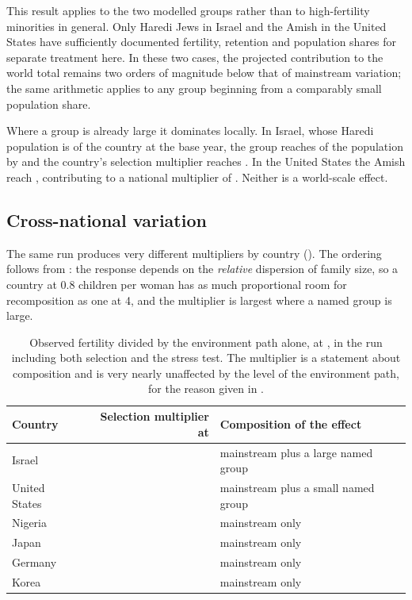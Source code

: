 This result applies to the two modelled groups rather than to high-fertility
minorities in general. Only Haredi Jews in Israel and the Amish in the United
States have sufficiently documented fertility, retention and population shares
for separate treatment here. In these two cases, the projected contribution to
the world total remains two orders of magnitude below that of mainstream
variation; the same arithmetic applies to any group beginning from a comparably
small population share.

Where a group is already large it dominates locally. In Israel, whose Haredi
population is \HarediShare{} of the country at the base year, the group reaches
\IsraelGroupShare{} of the population by \ProjectionEndYear{} and the country's
selection multiplier reaches \SelectionEffectIsrael{}. In the United States the
Amish reach \UnitedStatesGroupShare{}, contributing to a national multiplier of
\SelectionEffectUnitedStates{}. Neither is a world-scale effect.

\subsection{Cross-national variation}

The same run produces very different multipliers by country
(). The ordering follows from : the
response depends on the \emph{relative} dispersion of family size, so a country
at 0.8 children per woman has as much proportional room for recomposition as one
at 4, and the multiplier is largest where a named group is large.

\begin{table}[t]
\centering
\small
\begin{tabular}{lrl}
\toprule
Country & Selection multiplier at \ProjectionEndYear{} & Composition of the effect \\
\midrule
Israel          & \SelectionEffectIsrael{}        & mainstream plus a large named group \\
United States   & \SelectionEffectUnitedStates{}  & mainstream plus a small named group \\
Nigeria         & \SelectionEffectNigeria{}       & mainstream only \\
Japan           & \SelectionEffectJapan{}         & mainstream only \\
Germany         & \SelectionEffectGermany{}       & mainstream only \\
Korea           & \SelectionEffectKorea{}         & mainstream only \\
\bottomrule
\end{tabular}
\caption{Observed fertility divided by the environment path alone, at
\ProjectionEndYear{}, in the run including both selection and the
\PressureStressTest{} stress test. The multiplier is a statement about
composition and is very nearly unaffected by the level of the environment path,
for the reason given in .}
\label{tab:countries}
\end{table}

